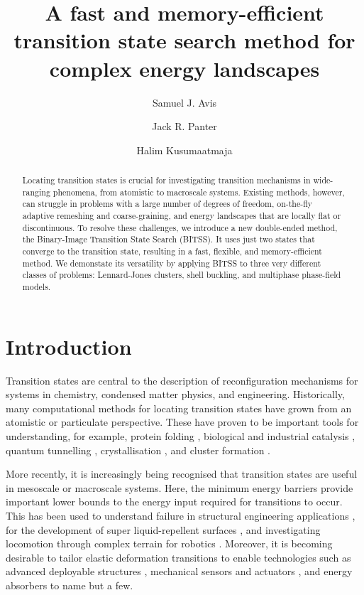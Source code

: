 \documentclass[twocolumn,10pt]{revtex4-2}
\begin{document}
\title{A fast and memory-efficient transition state search method for complex energy landscapes}
\author{Samuel J. Avis}
\author{Jack R. Panter}
\author{Halim Kusumaatmaja}

\begin{abstract}
  Locating transition states is crucial for investigating transition mechanisms in wide-ranging phenomena, from atomistic to macroscale systems.
  Existing methods, however, can struggle in problems with a large number of degrees of freedom, on-the-fly adaptive remeshing and coarse-graining, and energy landscapes that are locally flat or discontinuous.
  To resolve these challenges, we introduce a new double-ended method, the Binary-Image Transition State Search (BITSS).
  It uses just two states that converge to the transition state, resulting in a fast, flexible, and memory-efficient method.
  We demonstate its versatility by applying BITSS to three very different classes of problems: Lennard-Jones clusters, shell buckling, and multiphase phase-field models.
\end{abstract}

\maketitle


\section{Introduction}
Transition states are central to the description of reconfiguration mechanisms for systems in chemistry, condensed matter physics, and engineering.
Historically, many computational methods for locating transition states have grown from an atomistic or particulate perspective.
These have proven to be important tools for understanding, for example, protein folding \cite{Bryngelson1995,Onuchic1997}, biological and industrial catalysis \cite{Boehr2006,Kerns2015,Guo2018a}, quantum tunnelling \cite{Richardson2016,Vaillant2019}, crystallisation \cite{Richard2018}, and cluster formation \cite{Wales1998,Wales2012}.

More recently, it is increasingly being recognised that transition states are useful in mesoscale or macroscale systems.
Here, the minimum energy barriers provide important lower bounds to the energy input required for transitions to occur.
This has been used to understand failure in structural engineering applications \cite{Panter2019,Hutchinson2018}, for the development of super liquid-repellent surfaces \cite{Zhang2014,Panter2019b,Amabili2017}, and investigating locomotion through complex terrain for robotics \cite{Othayoth2020}.
Moreover, it is becoming desirable to tailor elastic deformation transitions to enable technologies such as advanced deployable structures \cite{Filipov2015,Zhai2018}, mechanical sensors and actuators \cite{Bertoldi2017,Truby2016,Chi2022,Bonfanti2020}, and energy absorbers \cite{Shan2015,Giri2021} to name but a few.
\end{document}
